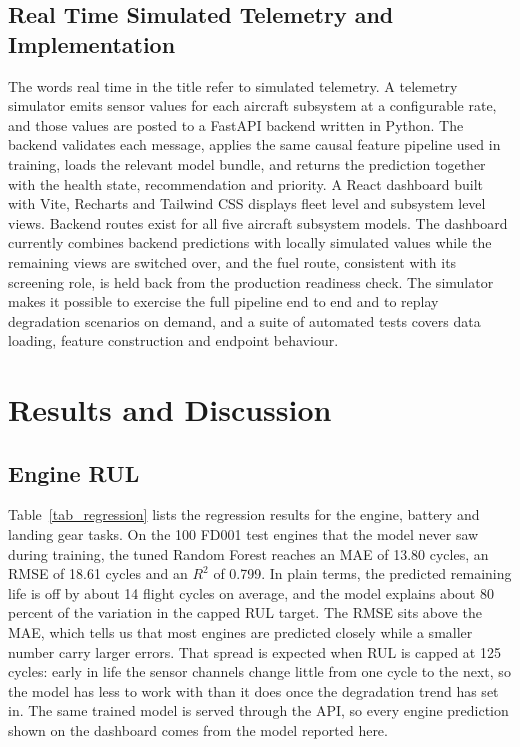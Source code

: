 \documentclass[conference]{IEEEtran}
\begin{document}
\subsection{Real Time Simulated Telemetry and Implementation}
The words real time in the title refer to simulated telemetry. A telemetry simulator emits sensor values for each aircraft subsystem at a configurable rate, and those values are posted to a FastAPI backend written in Python. The backend validates each message, applies the same causal feature pipeline used in training, loads the relevant model bundle, and returns the prediction together with the health state, recommendation and priority. A React dashboard built with Vite, Recharts and Tailwind CSS displays fleet level and subsystem level views. Backend routes exist for all five aircraft subsystem models. The dashboard currently combines backend predictions with locally simulated values while the remaining views are switched over, and the fuel route, consistent with its screening role, is held back from the production readiness check. The simulator makes it possible to exercise the full pipeline end to end and to replay degradation scenarios on demand, and a suite of automated tests covers data loading, feature construction and endpoint behaviour.

\section{Results and Discussion}

\subsection{Engine RUL}
Table~\ref{tab_regression} lists the regression results for the engine, battery and landing gear tasks. On the 100 FD001 test engines that the model never saw during training, the tuned Random Forest reaches an MAE of 13.80 cycles, an RMSE of 18.61 cycles and an $R^2$ of 0.799. In plain terms, the predicted remaining life is off by about 14 flight cycles on average, and the model explains about 80 percent of the variation in the capped RUL target. The RMSE sits above the MAE, which tells us that most engines are predicted closely while a smaller number carry larger errors. That spread is expected when RUL is capped at 125 cycles: early in life the sensor channels change little from one cycle to the next, so the model has less to work with than it does once the degradation trend has set in. The same trained model is served through the API, so every engine prediction shown on the dashboard comes from the model reported here.
\end{document}
